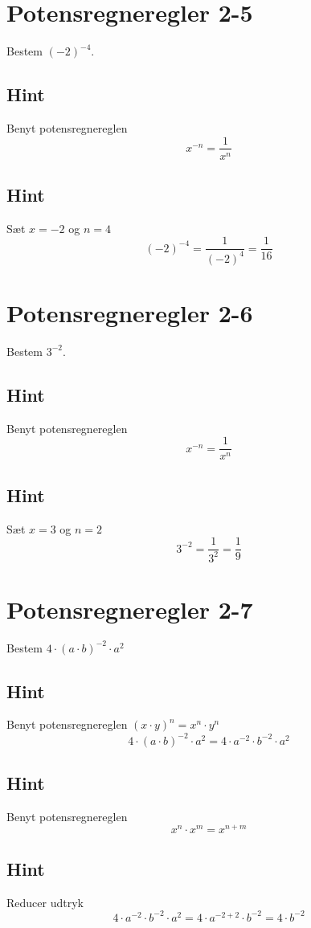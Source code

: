 \documentclass{article}
\newenvironment{exercise}[1]{\newpage\section{#1}}{}
\newcommand{\answerbox}[1]{\fbox{$#1$}}
\newcommand{\hint}{\subsection*{Hint}}
\begin{document}
\newpage

\begin{exercise}{Potensregneregler 2-5}
	
	Bestem $(-2)^{-4}$.
	
	\answerbox{\frac{1}{16}}
	
	\hint
	Benyt potensregnereglen 
	\[
	x^{-n} = \frac{1}{x^{n}} 
	\]
	
	\hint 
	
	Sæt $x=-2$ og $n=4$ 
	\[
	(-2)^{-4} = \frac{1}{(-2)^4} = \frac{1}{16}
	\]
	
\end{exercise}

\newpage

\begin{exercise}{Potensregneregler 2-6}
	
	Bestem $3^{-2}$.
	
	\answerbox{\frac{1}{9}}
	
	\hint
	Benyt potensregnereglen 
	\[
	x^{-n} = \frac{1}{x^{n}} 
	\]
	
	\hint 
	
	Sæt $x=3$ og $n=2$ 
	\[
	3^{-2} = \frac{1}{3^2} = \frac{1}{9}
	\]
	
\end{exercise}

\newpage

\begin{exercise}{Potensregneregler 2-7}
	
	Bestem $4 \cdot (a \cdot b)^{-2} \cdot a^2$
		
	\answerbox{4 \cdot b^{-2}}
	
	\hint
	
	Benyt potensregnereglen $(x \cdot y)^n = x^n \cdot y^n$
	\[
	4 \cdot (a \cdot b)^{-2} \cdot a^2 = 4 \cdot a^{-2} \cdot b^{-2} \cdot a^{2}
	\]
	
	\hint
	Benyt potensregnereglen 
	\[
	x^n \cdot x^m  = x^{n+m} 
	\]
	
	\hint 
	
	Reducer udtryk
	\[
	4 \cdot a^{-2} \cdot b^{-2} \cdot a^{2} = 4 \cdot a^{-2+2} \cdot b^{-2} = 4 \cdot b^{-2}
	\]
	
\end{exercise}

\newpage
\end{document}
